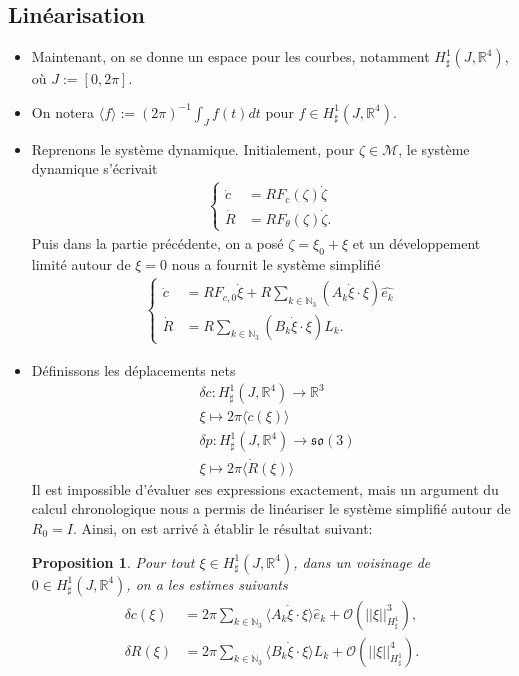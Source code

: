 \documentclass[10pt,a4paper]{article}
\theoremstyle{plain}
\theoremstyle{plain}
\theoremstyle{plain}
\theoremstyle{definition}
\theoremstyle{definition}
\theoremstyle{definition}
\theoremstyle{plain}
\newtheorem{proposition}{Proposition}[section]
\newcommand{\N}{\mathbb{N}}
\newcommand{\M}{\mathcal{M}}
\newcommand{\R}{\mathbb{R}}
\newcommand{\so}{\mathfrak{so}}
\begin{document}
\subsection{Linéarisation}
\begin{itemize}
\item Maintenant, on se donne un espace pour les courbes, notamment $H^1_{\sharp}(J, \R^4)$, où $J := [0, 2\pi]$.

\item On notera $\langle f \rangle := (2 \pi)^{-1 }\int_{J} f(t) d t$ pour $f \in H^1_{\sharp}(J, \R^4)$.

\item Reprenons le système dynamique. Initialement, pour $\zeta \in \M$, le système dynamique s'écrivait
\begin{align}
\begin{cases}
	\dot{c} &= R F_c(\zeta) \dot{\zeta}\\
	\dot{R} &= R F_{\theta}(\zeta) \dot{\zeta}.
\end{cases}
\end{align}
Puis dans la partie précédente, on a posé $\zeta = \xi_0 + \xi$ et un développement limité autour de $\xi = 0$ nous a fournit le système simplifié
 \begin{align}
 \label{eq: dynamics first approx}
 \begin{cases}
 	\dot{c} &= R F_{c,0} \dot{\xi} + R \sum_{k \in \N_3}(A_k \dot{\xi} \cdot \xi)\hat{e_k}\\
 	\dot{R} &= R \sum_{k \in \N_3} (B_k \dot{\xi} \cdot \xi) L_k.
 \end{cases}
 \end{align}
 
\item Définissons les déplacements nets
\begin{align}
	&\delta c: H_{\sharp}^1(J,\R^4) \to \R^3\\
	&\xi \mapsto 2\pi \langle \dot{c} (\xi) \rangle \nonumber \\
	&\delta p: H_{\sharp}^1(J,\R^4) \to \so(3)\\
	&\xi \mapsto 2 \pi \langle \dot{R}(\xi) \rangle \nonumber
\end{align}
Il est impossible d'évaluer ses expressions exactement, mais un argument du calcul chronologique nous a permis de linéariser le système simplifié autour de $R_0 = I$. Ainsi, on est arrivé à établir le résultat suivant:
\begin{proposition}
\label{prop:net displacement}
Pour tout $\xi \in H_\sharp^1(J, \R^4)$, dans un voisinage de $0 \in H_{\sharp}^{1}(J, \R^4)$, on a les estimes suivants
\begin{equation}
\begin{aligned}
\delta c(\xi) &= 2 \pi \sum_{k \in \N_3} \langle A_k \dot{\xi} \cdot \xi \rangle \hat{e}_k + \mathcal{O}(||\xi||_{H^1_{\sharp}}^3),\\
\delta R(\xi) &= 2 \pi \sum_{k \in \N_3} \langle B_k \dot{\xi} \cdot \xi \rangle L_k + \mathcal{O}(||\xi||^4_{H_\sharp^1}).
\end{aligned}
\end{equation}
\end{proposition}


\end{itemize}
\end{document}

